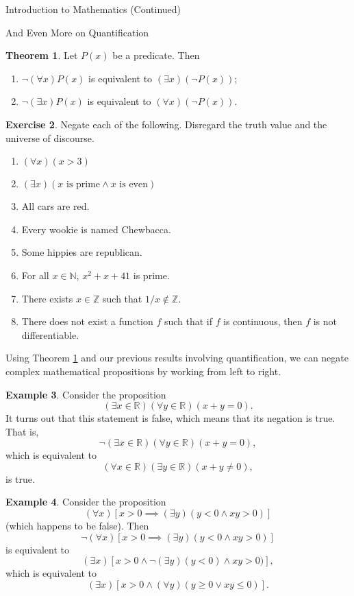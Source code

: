 \documentclass[11pt]{article}
\theoremstyle{definition}
\newtheorem{theorem}{Theorem}[section]
\newtheorem{example}[theorem]{Example}
\newtheorem{exercise}[theorem]{Exercise}
\begin{document}
\begin{section}{Introduction to Mathematics (Continued)}
\begin{subsection}{And Even More on Quantification}
\begin{theorem}\label{thm:negation of quantifiers}
Let $P(x)$ be a predicate.  Then
\begin{enumerate}
\item[1.] $\neg (\forall x)P(x)$ is equivalent to $(\exists x)(\neg P(x))$;
\item[2.] $\neg (\exists x)P(x)$ is equivalent to $(\forall x)(\neg P(x))$.
\end{enumerate}
\end{theorem}

\begin{exercise}
Negate each of the following.  Disregard the truth value and the universe of discourse.
\begin{enumerate}
\item $(\forall x)(x>3)$
\item $(\exists x)(x \mbox{ is prime}\wedge x \mbox{ is even})$
\item All cars are red.
\item Every wookie is named Chewbacca.
\item Some hippies are republican.
\item For all $x\in\mathbb{N}$, $x^2+x+41$ is prime.
\item There exists $x\in\mathbb{Z}$ such that $1/x\notin\mathbb{Z}$.
\item There does not exist a function $f$ such that if $f$ is continuous, then $f$ is not differentiable.
\end{enumerate}
\end{exercise}

Using Theorem \ref{thm:negation of quantifiers} and our previous results involving quantification, we can negate complex mathematical propositions by working from left to right.

\begin{example}
Consider the proposition
\[
(\exists x\in\mathbb{R})(\forall y\in\mathbb{R})(x+y=0).
\]
It turns out that this statement is false, which means that its negation is true.  That is,
\[
\neg(\exists x\in\mathbb{R})(\forall y\in\mathbb{R})(x+y=0),
\]
which is equivalent to
\[
(\forall x\in\mathbb{R})(\exists y\in\mathbb{R})(x+y\neq 0),
\]
is true.
\end{example}

\begin{example}
Consider the proposition
\[
(\forall x)[x>0\implies (\exists y)(y<0 \wedge xy>0)]
\]
(which happens to be false).  Then
\[
\neg (\forall x)[x>0\implies (\exists y)(y<0 \wedge xy>0)]
\]
is equivalent to
\[
(\exists x)[x>0 \wedge \neg (\exists y)(y<0) \wedge xy>0)],
\]
which is equivalent to 
\[
(\exists x)[x>0 \wedge (\forall y)(y\geq 0 \vee xy\leq 0)].
\]
\end{example}


\end{subsection}
\end{section}
\end{document}
